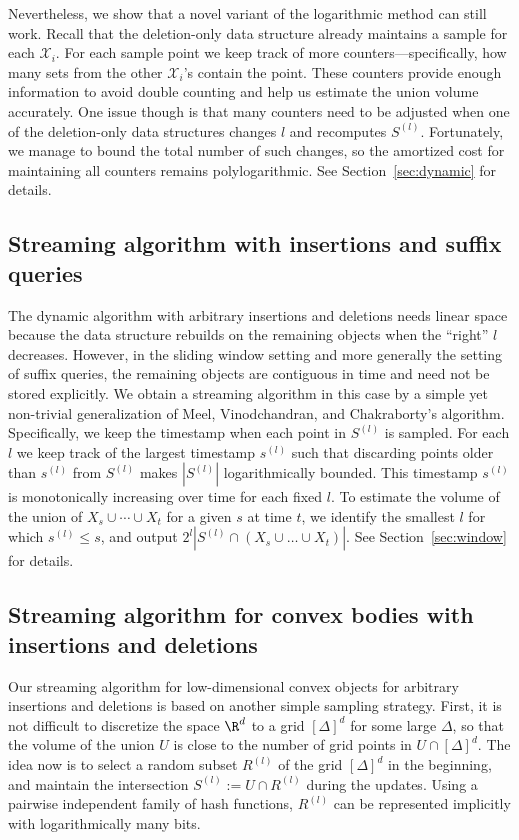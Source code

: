 \documentclass[a4paper, 11pt]{article}
\newcommand{\class}[1]{\mathcal{#1}}
\begin{document}
Nevertheless, we show that a novel variant of the logarithmic method can still work. Recall that the deletion-only data structure already maintains a sample for each $\class{X}_i$. For each sample point we keep track of more counters---specifically, how many sets from the other $\class{X}_i$'s contain the point. These counters provide enough information to avoid double counting and help us estimate the union volume accurately.
One issue though is that many counters need to be adjusted when one of the deletion-only data structures changes $l$ and recomputes $S^{(l)}$. Fortunately, we manage to bound the total number of such changes, so the amortized cost for maintaining all counters remains polylogarithmic. See Section~\ref{sec:dynamic} for details.

\subsection{Streaming algorithm with insertions and suffix queries}

The dynamic algorithm with arbitrary insertions and deletions needs linear space because the data structure rebuilds on the remaining objects when the ``right'' $l$ decreases. However, in the sliding window setting and more generally the setting of suffix queries, the remaining objects are contiguous in time and need not be stored explicitly. We obtain a streaming algorithm in this case by a simple yet non-trivial generalization of Meel, Vinodchandran, and Chakraborty's algorithm. Specifically, we keep the timestamp when each point in $S^{(l)}$ is sampled. For each $l$ we keep track of the largest timestamp $s^{(l)}$ such that discarding points older than $s^{(l)}$ from $S^{(l)}$ makes $|S^{(l)}|$ logarithmically bounded. This timestamp $s^{(l)}$ is monotonically increasing over time for each fixed $l$. To estimate the volume of the union of $X_s \cup \cdots \cup X_t$ for a given $s$ at time $t$, we identify the smallest $l$ for which $s^{(l)} \leq s$, and output $2^l|S^{(l)}\cap (X_s \cup \ldots \cup X_t)|$. See Section~\ref{sec:window} for details.


\subsection{Streaming algorithm for convex bodies with insertions and deletions}
Our streaming algorithm for low-dimensional convex objects for arbitrary insertions and deletions is based on another simple sampling strategy. First, it is not difficult to discretize the space $\R^d$ to a grid $[\Delta]^d$ for some large $\Delta$, so that the volume of the union $U$ is close to the number of grid points in $U \cap [\Delta]^d$. The idea now is to select a random subset $R^{(l)}$ of the grid $[\Delta]^d$ in the beginning, and maintain the intersection $S^{(l)} := U \cap R^{(l)}$ during the updates. Using a pairwise independent family of hash functions, $R^{(l)}$ can be represented implicitly with logarithmically many bits.
\end{document}
